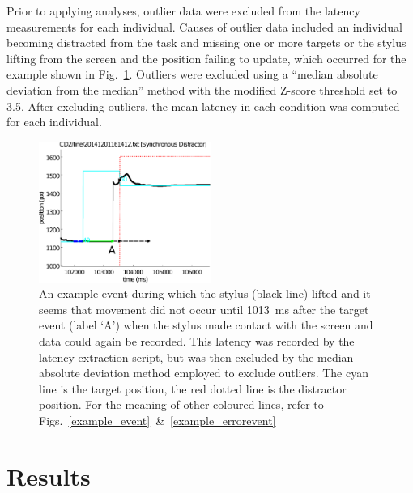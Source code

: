 \documentclass[10pt,letterpaper]{article}
\newcommand{\filename}[1]{\textsf{\textbf{#1}}}
\newcommand{\codeparam}[1]{\textsf{\textbf{#1}}}
\begin{document}
Prior to applying analyses, outlier data were excluded from the
latency measurements for each individual.
%
%
Causes of outlier data included an individual becoming distracted from
the task and missing one or more targets or the stylus lifting from
the screen and the position failing to update, which occurred for the
example shown in Fig.~\ref{stylus_lifted}. Outliers were excluded
using a ``median absolute deviation from the median'' method
\cite{boris_iglewicz_how_1993} with the modified Z-score threshold set
to 3.5. After excluding outliers, the mean latency in each condition
was computed for each individual.

\begin{figure}[htb!]
\centering
\includegraphics[width=0.5\textwidth]{./figures/stylus_lifted_nolegend.eps}
\caption[Stylus lifted] {An example event during which the stylus
  (black line) lifted and it seems that movement did not occur until
  1013~ms after the target event (label `A') when the stylus made
  contact with the screen and data could again be recorded. This
  latency was recorded by the latency extraction script, but was then
  excluded by the median absolute deviation method employed to exclude
  outliers. The cyan line is the target position, the red dotted line
  is the distractor position. For the meaning of other coloured lines,
  refer to Figs.~\ref{example_event}~\&~\ref{example_errorevent}}
\label{stylus_lifted}
\end{figure}


\section*{Results}
\end{document}
